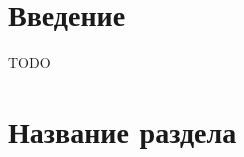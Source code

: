 \documentclass[12pt,twoside]{article}
\title
    {Автоматическая настройка параметров BigARTM под широкий класс задач.}
\author
    {Гришанов~А.\,В., Булатов~B.\,Г., Воронцов~К.\,В.} %
    [Гришанов~А.\,В.$^1$, Булатов~B.\,Г.$^1$, Воронцов~К.\,В.$^1$] %
\begin{document}
\maketitle
\section{Введение}

{\Huge TODO}


\section{Название раздела}
\end{document}
